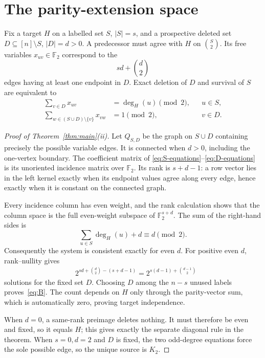 \documentclass[a4paper,10pt]{amsart}
\theoremstyle{remark}
\newcommand{\Ftwo}{\mathbb F_2}
\begin{document}
\section{The parity-extension space}\label{sec:inverse}

Fix a target $H$ on a labelled set $S$, $|S|=s$, and a prospective deleted
set $D\subseteq[n]\setminus S$, $|D|=d>0$.  A predecessor must agree with
$H$ on $\binom S2$.  Its free variables $x_{uv}\in\Ftwo$ correspond to the
\[
 sd+\binom d2
\]
edges having at least one endpoint in $D$.  Exact deletion of $D$ and survival
of $S$ are equivalent to
\begin{align}
 \sum_{v\in D}x_{uv}&=\deg_H(u)\pmod2,
        &&u\in S,                                      \label{eq:S-equations}\\
 \sum_{w\in(S\cup D)\setminus\{v\}}x_{vw}&=1\pmod2,
        &&v\in D.                                      \label{eq:D-equations}
\end{align}

\begin{proof}[Proof of Theorem~\ref{thm:main}(ii)]
Let $Q_{S,D}$ be the graph on $S\cup D$ containing precisely the possible
variable edges.  It is connected when $d>0$, including the one-vertex
boundary.  The coefficient matrix of
\eqref{eq:S-equations}--\eqref{eq:D-equations} is its unoriented incidence
matrix over $\Ftwo$.  Its rank is $s+d-1$: a row vector lies in the left
kernel exactly when its endpoint values agree along every edge, hence exactly
when it is constant on the connected graph.

Every incidence column has even weight, and the rank calculation shows that
the column space is the full even-weight subspace of $\Ftwo^{s+d}$.  The sum
of the right-hand sides is
\[
 \sum_{u\in S}\deg_H(u)+d\equiv d\pmod2.
\]
Consequently the system is consistent exactly for even $d$.  For positive
even $d$, rank--nullity gives
\begin{align*}
 &2^{sd+\binom d2-(s+d-1)}
   =2^{s(d-1)+\binom{d-1}{2}}
\end{align*}
solutions for the fixed set $D$.  Choosing $D$ among the $n-s$ unused labels
proves~\eqref{eq:B}.  The count depends on $H$ only through the parity-vector
sum, which is automatically zero, proving target independence.

When $d=0$, a same-rank preimage deletes nothing.  It must therefore be even
and fixed, so it equals $H$; this gives exactly the separate diagonal rule in
the theorem.  When $s=0,d=2$ and $D$ is fixed, the two odd-degree equations
force the sole possible edge, so the unique source is $K_2$.
\end{proof}
\end{document}
